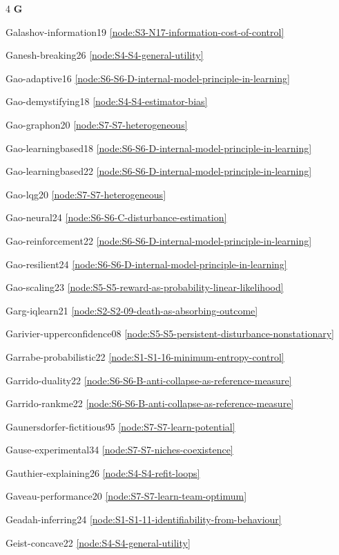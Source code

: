 \documentclass[10pt]{article}
\begin{document}
{\begin{multicols}{4}
\smallskip\textbf{G}\par
Galashov-information19 \hfill \ref{node:S3-N17-information-cost-of-control}\par
Ganesh-breaking26 \hfill \ref{node:S4-S4-general-utility}\par
Gao-adaptive16 \hfill \ref{node:S6-S6-D-internal-model-principle-in-learning}\par
Gao-demystifying18 \hfill \ref{node:S4-S4-estimator-bias}\par
Gao-graphon20 \hfill \ref{node:S7-S7-heterogeneous}\par
Gao-learningbased18 \hfill \ref{node:S6-S6-D-internal-model-principle-in-learning}\par
Gao-learningbased22 \hfill \ref{node:S6-S6-D-internal-model-principle-in-learning}\par
Gao-lqg20 \hfill \ref{node:S7-S7-heterogeneous}\par
Gao-neural24 \hfill \ref{node:S6-S6-C-disturbance-estimation}\par
Gao-reinforcement22 \hfill \ref{node:S6-S6-D-internal-model-principle-in-learning}\par
Gao-resilient24 \hfill \ref{node:S6-S6-D-internal-model-principle-in-learning}\par
Gao-scaling23 \hfill \ref{node:S5-S5-reward-as-probability-linear-likelihood}\par
Garg-iqlearn21 \hfill \ref{node:S2-S2-09-death-as-absorbing-outcome}\par
Garivier-upperconfidence08 \hfill \ref{node:S5-S5-persistent-disturbance-nonstationary}\par
Garrabe-probabilistic22 \hfill \ref{node:S1-S1-16-minimum-entropy-control}\par
Garrido-duality22 \hfill \ref{node:S6-S6-B-anti-collapse-as-reference-measure}\par
Garrido-rankme22 \hfill \ref{node:S6-S6-B-anti-collapse-as-reference-measure}\par
Gaunersdorfer-fictitious95 \hfill \ref{node:S7-S7-learn-potential}\par
Gause-experimental34 \hfill \ref{node:S7-S7-niches-coexistence}\par
Gauthier-explaining26 \hfill \ref{node:S4-S4-refit-loops}\par
Gaveau-performance20 \hfill \ref{node:S7-S7-learn-team-optimum}\par
Geadah-inferring24 \hfill \ref{node:S1-S1-11-identifiability-from-behaviour}\par
Geist-concave22 \hfill \ref{node:S4-S4-general-utility}\par

\end{multicols}}
\end{document}
